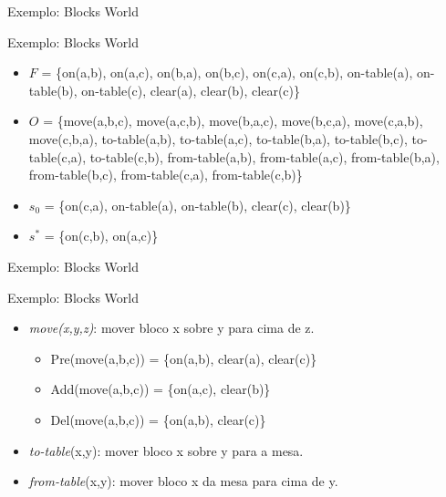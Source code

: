 \documentclass{beamer}
\begin{document}
\begin{frame}{Exemplo: Blocks World}
    \begin{exampleblock}{\strut Exemplo: Blocks World}
      \begin{itemize}
      \item $F$ = \{on(a,b), on(a,c), on(b,a), on(b,c), on(c,a), on(c,b), on-table(a), on-table(b), on-table(c), clear(a), clear(b), clear(c)\}

       \item $O$ = \{move(a,b,c), move(a,c,b), move(b,a,c), move(b,c,a), move(c,a,b), move(c,b,a), to-table(a,b), to-table(a,c), to-table(b,a), to-table(b,c), to-table(c,a), to-table(c,b), from-table(a,b), from-table(a,c), from-table(b,a), from-table(b,c), from-table(c,a), from-table(c,b)\}

        \item $s_{0}$ = \{on(c,a), on-table(a), on-table(b), clear(c), clear(b)\}

         \item $s^{*}$ = \{on(c,b), on(a,c)\}
      \end{itemize}
    \end{exampleblock}
\end{frame}

\begin{frame}{Exemplo: Blocks World}
    \begin{exampleblock}{\strut Exemplo: Blocks World}
      \begin{itemize}
      \item \emph{move(x,y,z)}: mover bloco x sobre y para cima de z.
      \begin{itemize}
        \item Pre(move(a,b,c)) = \{on(a,b), clear(a), clear(c)\}
        \item Add(move(a,b,c)) = \{on(a,c), clear(b)\}
        \item Del(move(a,b,c)) = \{on(a,b), clear(c)\}
      \end{itemize}
      \item \emph{to-table}(x,y): mover bloco x sobre y para a mesa.
      \item \emph{from-table}(x,y): mover bloco x da mesa para cima de y.
      \end{itemize}
    \end{exampleblock}
\end{frame}
\end{document}
